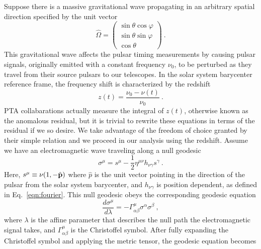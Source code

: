 \documentclass[prd,aps,psfig,nofootinbib,nobibnotes,superscriptaddress,preprintnumbers,times]{revtex4-2}\setlength{\topmargin}{-14mm}
\begin{document}
Suppose there is a massive gravitational wave propagating in an arbitrary spatial direction specified by the unit vector
\begin{equation}\label{eqn:omega}
    \hat{\Omega} = \begin{pmatrix}
                        \sin\theta \cos\varphi \\
                        \sin\theta \sin\varphi \\
                        \cos\theta
                    \end{pmatrix} \ .
\end{equation}
This gravitational wave affects the pulsar timing measurements by causing pulsar signals, originally emitted with a constant frequency $\nu_0$, to be perturbed as they travel from their source pulsars to our telescopes. 
In the solar system barycenter reference frame, the frequency shift is characterized by the redshift
\begin{equation}\label{eqn:z}
    z(t) = \frac{\nu_0 - \nu(t)}{\nu_0} \ .
\end{equation}
PTA collabarations actually measure the integral of $z(t)$, otherwise known as the anomalous residual, but it is trivial to rewrite these equations in terms of the residual if we so desire. We take advantage of the freedom of choice granted by their simple relation and we proceed in our analysis using the redshift. 
Assume we have an electromagnetic wave traveling along a null geodesic 
\begin{equation}\label{eqn:null}
    \sigma^\mu = s^\mu - \frac{1}{2} \eta^{\mu\nu}h_{\nu \gamma}s^\gamma \ .
\end{equation}
Here, $s^\mu \equiv \nu (1, -\hat{\bf p})$ where $\hat{p}$ is the unit vector pointing in the direction of the pulsar from the solar system barycenter, and $h_{\nu \gamma}$ is position dependent, as defined in Eq.\ \ref{eqn:fourier}. This null geodesic obeys the corresponding geodesic equation 
\begin{equation}\label{eqn:geodesic}
    \frac{d\sigma^\mu}{d\lambda} = -\Gamma_{\alpha \beta}^\mu \sigma^\alpha \sigma^\beta \ ,
\end{equation} where $\lambda$ is the affine parameter that describes the null path the electromagnetic signal takes, and $\Gamma_{\alpha \beta}^\mu$ is the Christoffel symbol. After fully expanding the Christoffel symbol and applying the metric tensor, the geodesic equation becomes  
\end{document}
